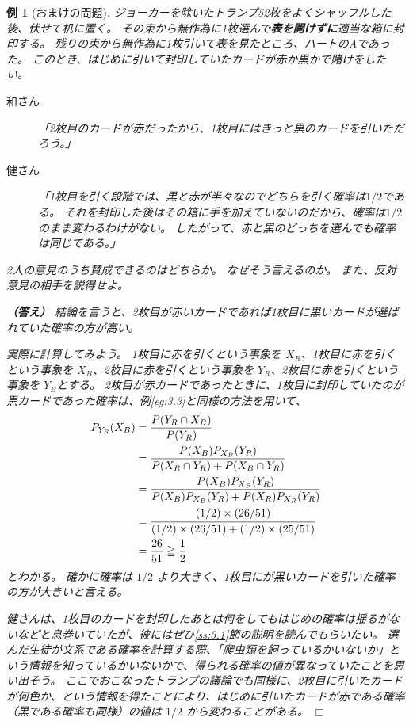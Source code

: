 \documentclass[12pt]{ltjsarticle}\usepackage{ifthen}\newcounter{enlarge}\setcounter{enlarge}{1}
\def\qed{\hfill $\Box$}
\newtheorem{eg}{例}
\begin{document}
\begin{eg}[おまけの問題]
  ジョーカーを除いたトランプ52枚をよくシャッフルした後、伏せて机に置く。
  その束から無作為に1枚選んで\textbf{表を開けずに}適当な箱に封印する。
  残りの束から無作為に1枚引いて表を見たところ、ハートのAであった。
  このとき、はじめに引いて封印していたカードが赤か黒かで賭けをしたい。
  \begin{description}
  \item[和さん]  「2枚目のカードが赤だったから、1枚目にはきっと黒のカードを引いただろう。」
  \item[健さん]  「1枚目を引く段階では、黒と赤が半々なのでどちらを引く確率は$1/2$である。
    それを封印した後はその箱に手を加えていないのだから、確率は$1/2$のまま変わるわけがない。
    したがって、赤と黒のどっちを選んでも確率は同じである。」
  \end{description}

  2人の意見のうち賛成できるのはどちらか。
  なぜそう言えるのか。
  また、反対意見の相手を説得せよ。

  \textbf{（答え）}
  結論を言うと、2枚目が赤いカードであれば1枚目に黒いカードが選ばれていた確率の方が高い。

  実際に計算してみよう。
  1枚目に赤を引くという事象を $X_R$、1枚目に赤を引くという事象を $X_B$、2枚目に赤を引くという事象を $Y_R$、2枚目に赤を引くという事象を $Y_B$とする。
  2枚目が赤カードであったときに、1枚目に封印していたのが黒カードであった確率は、例\ref{eg:3.3}と同様の方法を用いて、
  \begin{align}
    P_{Y_R } (X_B) &= \frac{P(Y_R \cap X_B )}{P(Y_R )} \notag \\
                    &= \frac{P(X_B ) P_{X_B} (Y_R )}{P(X_R \cap Y_R) + P(X_B \cap Y_R) } \notag \\
                    &= \frac{P(X_B ) P_{X_B} (Y_R )}{P(X_B ) P_{X_B} (Y_R ) + P(X_R ) P_{X_R} (Y_R ) } \notag \\
                    &= \cfrac{(1/2) \times (26/51)}{(1/2) \times (26/51) + (1/2) \times (25/51) } \notag \\
                    &= \frac{26}{51} \geqq \frac{1}{2} 
  \end{align}
  とわかる。
  確かに確率は $1/2$ より大きく、1枚目にが黒いカードを引いた確率の方が大きいと言える。

  健さんは、1枚目のカードを封印したあとは何をしてもはじめの確率は揺るがないなどと息巻いていたが、彼にはぜひ\ref{ss:3.1}節の説明を読んでもらいたい。
  選んだ生徒が文系である確率を計算する際、「爬虫類を飼っているかいないか」という情報を知っているかいないかで、得られる確率の値が異なっていたことを思い出そう。
  ここでおこなったトランプの議論でも同様に、2枚目に引いたカードが何色か、という情報を得たことにより、はじめに引いたカードが赤である確率（黒である確率も同様）の値は $1/2$ から変わることがある。
\qed\end{eg}
\end{document}
